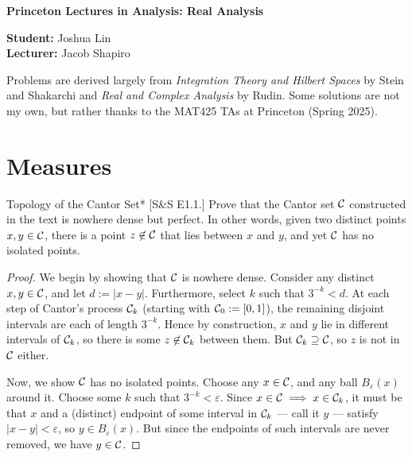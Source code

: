





\begin{Large}
    \textsf{\textbf{Princeton Lectures in Analysis: Real Analysis}}
\end{Large}

\vspace{1ex}

\textsf{\textbf{Student:}} Joshua Lin \\
\textsf{\textbf{Lecturer:}} Jacob Shapiro

\vspace{2ex}

Problems are derived largely from \textit{Integration Theory and Hilbert Spaces} by Stein and Shakarchi and \textit{Real and Complex Analysis} by Rudin. Some solutions are not my own, but rather thanks to the MAT425 TAs at Princeton (Spring 2025). 

\section{Measures}

\begin{problem}{Topology of the Cantor Set}*
[S\&S E1.1.] Prove that the Cantor set $\mathcal{C}$ constructed in the text is nowhere dense but perfect. In other words, given two distinct points $x, y \in \mathcal{C}$, there is a point $z \not\in \mathcal{C}$ that lies between $x$ and $y$, and yet $\mathcal{C}$ has no isolated points. 
\end{problem}

\begin{proof}
    We begin by showing that $\mathcal{C}$ is nowhere dense. Consider any distinct $x, y \in \mathcal{C}$, and let $d := |x - y|$. Furthermore, select $k$ such that $3^{-k} < d$. At each step of Cantor's process $\mathcal{C}_k$ (starting with $\mathcal{C}_0 := [0, 1]$), the remaining disjoint intervals are each of length $3^{-k}$. Hence by construction, $x$ and $y$ lie in different intervals of $\mathcal{C}_k$, so there is some $z \not\in \mathcal{C}_k$ between them. But $\mathcal{C}_k \supseteq \mathcal{C}$, so $z$ is not in $\mathcal{C}$ either. 
    \stdvspace

    Now, we show $\mathcal{C}$ has no isolated points. Choose any $x \in \mathcal{C}$, and any ball $B_{\varepsilon}(x)$ around it. Choose some $k$ such that $3^{-k} < \varepsilon$. Since $x \in \mathcal{C} \implies x \in \mathcal{C}_k$, it must be that $x$ and a (distinct) endpoint of some interval in $\mathcal{C}_k$ --- call it $y$ --- satisfy $|x - y| < \varepsilon$, so $y \in B_{\varepsilon}(x)$. But since the endpoints of such intervals are never removed, we have $y \in \mathcal{C}$. 
\end{proof}

